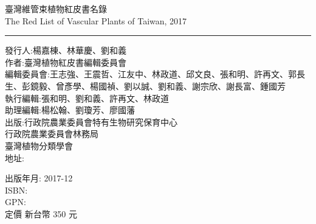 \cleardoublepage
\pagestyle{plain}
\thispagestyle{empty}
 臺灣維管束植物紅皮書名錄 \\
The Red List of Vascular Plants of Taiwan, 2017 \\

\hrule

\noindent 發行人:楊嘉棟、林華慶、劉和義 \\
作者:臺灣植物紅皮書編輯委員會 \\
編輯委員會:王志強、王震哲、江友中、林政道、邱文良、張和明、許再文、郭長生、彭鏡毅、曾彥學、楊國禎、劉以誠、劉和義、謝宗欣、謝長富、鍾國芳 \\
執行編輯:張和明、劉和義、許再文、林政道 \\
助理編輯:楊松翰、劉瓊芳、廖國藩 \\
出版:行政院農業委員會特有生物研究保育中心 \\
\indent  行政院農業委員會林務局 \\
\indent  臺灣植物分類學會 \\
地址:


出版年月: 2017-12 \\
ISBN: \\
GPN: \\
定價 新台幣 350 元


